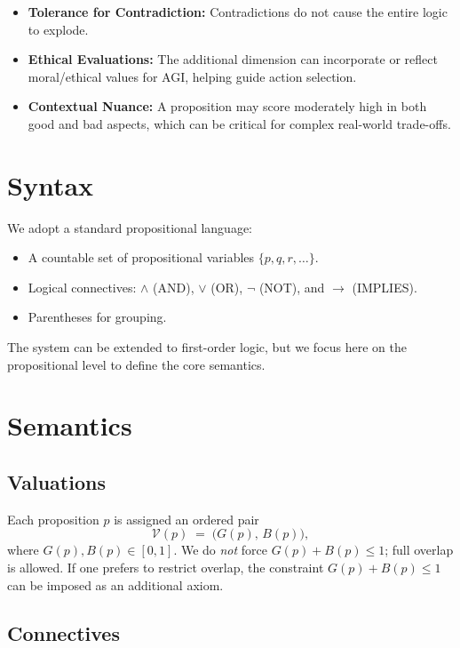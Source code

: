 \documentclass[11pt]{article}
\begin{document}
\begin{itemize}
    \item \textbf{Tolerance for Contradiction:} Contradictions do not cause the entire logic to explode.
    \item \textbf{Ethical Evaluations:} The additional dimension can incorporate or reflect 
    moral/ethical values for AGI, helping guide action selection.
    \item \textbf{Contextual Nuance:} A proposition may score moderately high in both 
    good and bad aspects, which can be critical for complex real-world trade-offs.
\end{itemize}

\section{Syntax}

We adopt a standard propositional language:
\begin{itemize}
    \item A countable set of propositional variables \(\{p,q,r,\dots\}\).
    \item Logical connectives: \(\land\) (AND), \(\lor\) (OR), \(\lnot\) (NOT), and \(\to\) (IMPLIES).
    \item Parentheses for grouping.
\end{itemize}

The system can be extended to first-order logic, but we focus here on the propositional level 
to define the core semantics.

\section{Semantics}

\subsection{Valuations}

Each proposition \(p\) is assigned an ordered pair
\[
   \mathcal{V}(p) \;=\; \bigl(G(p),\,B(p)\bigr),
\]
where \(G(p), B(p) \in [0,1]\). We do \emph{not} force \(G(p) + B(p) \le 1\); full overlap is allowed. 
If one prefers to restrict overlap, the constraint \(G(p) + B(p) \le 1\) can be imposed as an additional axiom.

\subsection{Connectives}
\end{document}
